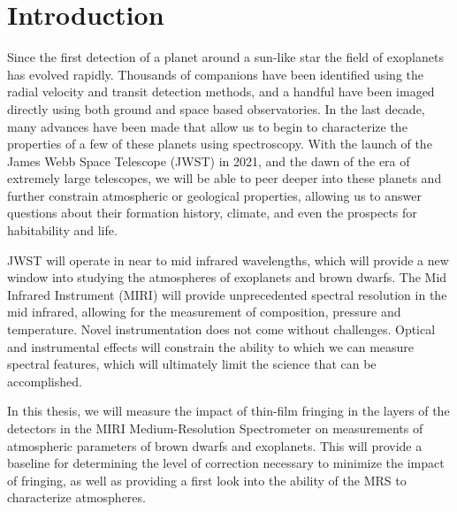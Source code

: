 \newcommand{\bpic}{$\beta$ Pic b }
\newcommand{\mj}{M$_{j}$}
\chapter{Introduction}
Since the first detection of a planet around a sun-like star \autocite{Mayor1995} the field of exoplanets has evolved rapidly.
Thousands of companions have been identified using the radial velocity and transit detection methods, and a handful have been imaged directly using both ground and space based observatories.
In the last decade, many advances have been made that allow us to begin to characterize the properties of a few of these planets using spectroscopy.
With the launch of the James Webb Space Telescope (JWST) in 2021, and the dawn of the era of extremely large telescopes, we will be able to peer deeper into these planets and further constrain atmospheric or geological properties, allowing us to answer questions about their formation history, climate, and even the prospects for habitability and life.

JWST will operate in near to mid infrared wavelengths, which will provide a new window into studying the atmospheres of exoplanets and brown dwarfs. 
The Mid Infrared Instrument (MIRI) will provide unprecedented spectral resolution in the mid infrared, allowing for the measurement of composition, pressure and temperature. 
Novel instrumentation does not come without challenges. 
Optical and instrumental effects will constrain the ability to which we can measure spectral features, which will ultimately limit the science that can be accomplished.

In this thesis, we will measure the impact of thin-film fringing in the layers of the detectors in the MIRI Medium-Resolution Spectrometer on measurements of atmospheric parameters of brown dwarfs and exoplanets.
This will provide a baseline for determining the level of correction necessary to minimize the impact of fringing, as well as providing a first look into the ability of the MRS to characterize atmospheres.


